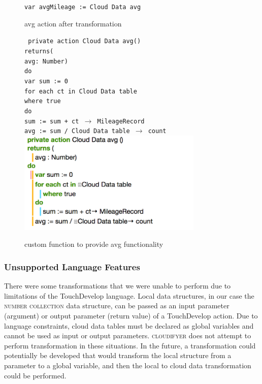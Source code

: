 \documentclass{sigplanconf}
\begin{document}
\begin{figure}[htbp!]
\begin{center}
\texttt{var avgMileage := Cloud Data avg}
\nocaptionrule
\caption{avg action after transformation}
\label{fig:CloudTable_avg}
\end{center}

\end{figure}
\begin{figure}[htbp!]
\texttt{ private action Cloud Data avg()\\ 
returns(\\
avg: Number)\\
do\\
var sum := 0\\
for each ct in Cloud Data table\\
where true\\
do\\
sum := sum + ct $\rightarrow$ MileageRecord\\
avg := sum / Cloud Data table $\rightarrow$ count}
\includegraphics[width=250pt]{images/HelperFunction}
\nocaptionrule
\caption{custom function to provide avg functionality}
\label{fig:CloudTable_avg_fun}
\end{figure}

\subsubsection{Unsupported Language Features}
\label{sec:unsupportedLanguageFeatures}
There were some transformations that we were unable to perform due to limitations of the TouchDevelop language.  Local data structures, in our case the \textsc{number collection} data structure, can be passed as an input parameter (argument) or output parameter (return value) of a TouchDevelop action.  Due to language constraints, cloud data tables must be declared as global variables and cannot be used as input or output parameters.  \textsc{cloudifyer} does not attempt to perform transformation in these situations.  In the future, a transformation could potentially be developed that would transform the local structure from a parameter to a global variable, and then the local to cloud data transformation could be performed.
\end{document}
